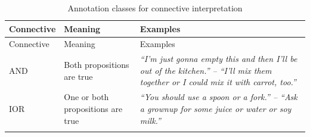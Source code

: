 \documentclass[oneside]{report}
\theoremstyle{definition}
\theoremstyle{definition}
\theoremstyle{definition}
\theoremstyle{remark}
\begin{document}
\begin{longtable}[]{@{}lll@{}}
\caption{\label{tab:connectiveInterpretaion} Annotation classes for
connective interpretation}\tabularnewline
\toprule
\begin{minipage}[b]{0.11\columnwidth}\raggedright\strut
Connective\strut
\end{minipage} & \begin{minipage}[b]{0.27\columnwidth}\raggedright\strut
Meaning\strut
\end{minipage} & \begin{minipage}[b]{0.54\columnwidth}\raggedright\strut
Examples\strut
\end{minipage}\tabularnewline
\midrule
\endfirsthead
\toprule
\begin{minipage}[b]{0.11\columnwidth}\raggedright\strut
Connective\strut
\end{minipage} & \begin{minipage}[b]{0.27\columnwidth}\raggedright\strut
Meaning\strut
\end{minipage} & \begin{minipage}[b]{0.54\columnwidth}\raggedright\strut
Examples\strut
\end{minipage}\tabularnewline
\midrule
\endhead
\begin{minipage}[t]{0.11\columnwidth}\raggedright\strut
AND\strut
\end{minipage} & \begin{minipage}[t]{0.27\columnwidth}\raggedright\strut
Both propositions are true\strut
\end{minipage} & \begin{minipage}[t]{0.54\columnwidth}\raggedright\strut
\emph{``I'm just gonna empty this and then I'll be out of the kitchen.''
-- ``I'll mix them together or I could mix it with carrot, too.''}\strut
\end{minipage}\tabularnewline
\begin{minipage}[t]{0.11\columnwidth}\raggedright\strut
IOR\strut
\end{minipage} & \begin{minipage}[t]{0.27\columnwidth}\raggedright\strut
One or both propositions are true\strut
\end{minipage} & \begin{minipage}[t]{0.54\columnwidth}\raggedright\strut
\emph{``You should use a spoon or a fork.'' -- ``Ask a grownup for some
juice or water or soy milk.''}\strut
\end{minipage}\tabularnewline
\begin{minipage}[t]{0.11\columnwidth}\raggedright\strut

\end{minipage}
\end{longtable}
\end{document}
